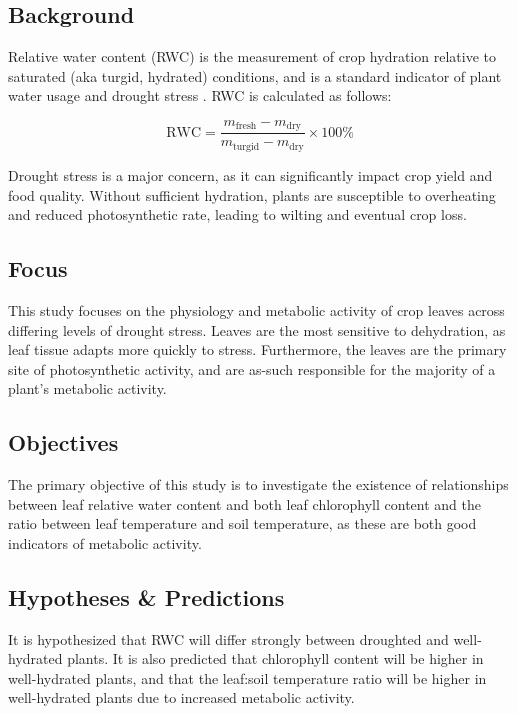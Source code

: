 \documentclass{report}
\begin{document}
\subsection{Background}


Relative water content (RWC) is the measurement of crop hydration relative to saturated (aka turgid, hydrated) conditions, and is a standard indicator of plant water usage and drought stress \parencite{drought}. RWC is calculated as follows:

\[ \text{RWC} = \frac{m_\text{fresh} - m_\text{dry}}{m_\text{turgid} - m_\text{dry}} \times 100\% \]

Drought stress is a major concern, as it can significantly impact crop yield and food quality. Without sufficient hydration, plants are susceptible to overheating and reduced photosynthetic rate, leading to wilting and eventual crop loss.

\subsection{Focus}

This study focuses on the physiology and metabolic activity of crop leaves across differing levels of drought stress. Leaves are the most sensitive to dehydration, as leaf tissue adapts more quickly to stress. Furthermore, the leaves are the primary site of photosynthetic activity, and are as-such responsible for the majority of a plant's metabolic activity.

\subsection{Objectives}

The primary objective of this study is to investigate the existence of relationships between leaf relative water content and both leaf chlorophyll content and the ratio between leaf temperature and soil temperature, as these are both good indicators of metabolic activity.

\subsection{Hypotheses \& Predictions}

It is hypothesized that RWC will differ strongly between droughted and well-hydrated plants. It is also predicted that chlorophyll content will be higher in well-hydrated plants, and that the leaf:soil temperature ratio will be higher in well-hydrated plants due to increased metabolic activity.
\end{document}

